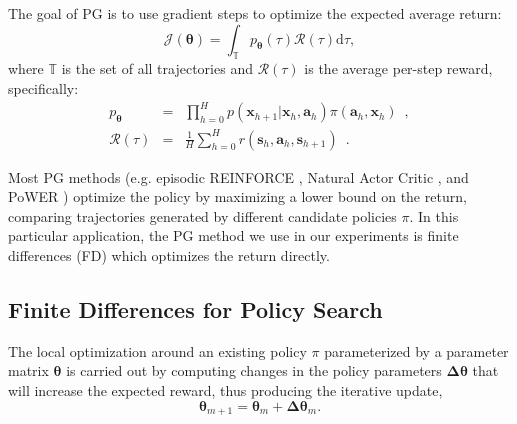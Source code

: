 \documentclass{aamas2016}
\begin{document}
The goal of PG is to use gradient steps to optimize the expected average return:
\begin{equation}
 \mathcal{J}(\boldsymbol{\theta})=\int_{\mathbb{T}}p_{\boldsymbol{\theta}}(\tau)\mathcal{R}(\tau)\mbox{d}\tau,
 \label{retPG}
\end{equation}
where $\mathbb{T}$ is the set of all trajectories and $\mathcal{R}(\tau)$ is the average per-step reward, specifically:
\begin{eqnarray}
 p_{\boldsymbol{\theta}} & = & \prod_{h=0}^{H}p(\mathbf{x}_{h+1}|\mathbf{x}_{h},\mathbf{a}_{h})\pi(\mathbf{a}_{h},\mathbf{x}_{h})  \enspace, \nonumber \\
 \mathcal{R}(\tau) & = & \frac{1}{H}\sum_{h=0}^{H} r(\mathbf{s}_{h},\mathbf{a}_{h},\mathbf{s}_{h+1})  \enspace. \nonumber
\end{eqnarray}

Most PG methods (e.g. episodic REINFORCE \cite{williams1992simple}, Natural Actor 
Critic \cite{peters2008natural}, and PoWER \cite{kober2009policy}) optimize the policy by maximizing a lower bound on the return, 
comparing trajectories generated by different candidate policies $\pi$. 
In this particular application, the PG method we use in our experiments is finite differences (FD) \cite{Bagnell-2013} 
which optimizes the return directly.

\subsection{Finite Differences for Policy Search}
The local optimization around an existing policy $\pi$ parameterized by a parameter matrix $\boldsymbol{\theta}$ 
is carried out by computing changes in the policy parameters $\boldsymbol{\Delta \theta}$ that will increase the expected reward, thus
producing the iterative update,
\begin{displaymath}
 \boldsymbol{\theta}_{m+1} = \boldsymbol{\theta}_{m}+\boldsymbol{\Delta \theta}_{m}.
\end{displaymath}
\end{document}
